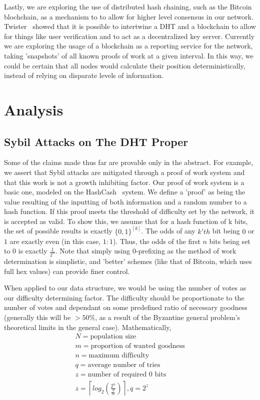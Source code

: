 \documentclass[10pt]{IEEEtran}
\providecommand{\myceil}[1]{\left \lceil #1 \right \rceil }
\begin{document}
\par Lastly, we are exploring the use of distributed hash chaining, such as the Bitcoin blochchain, as a mechanism to to allow for higher level consensus in our network. Twister~\cite{Freitas:2013tb} showed that it is possible to intertwine a DHT and a blockchain to allow for things like user verification and to act as a decentralized key server. Currently we are exploring the usage of a blockchain as a reporting service for the network, taking 'snapshots' of all known proofs of work at a given interval. In this way, we could be certain that all nodes would calculate their position deterministically, instead of relying on disparate levels of information.

\section{Analysis}
\subsection{Sybil Attacks on The DHT Proper}
\par Some of the claims made thus far are provable only in the abstract. For example, we assert that Sybil attacks are mitigated through a proof of work system and that this work is not a growth inhibiting factor. Our proof of work system is a basic one, modeled on the HashCash~\cite{Back:2002vq} system. We define a 'proof' as being the value resulting of the inputting of both information and a random number to a hash function. If this proof meets the threshold of difficulty set by the network, it is accepted as valid. To show this, we assume that for a hash function of k bits, the set of possible results is exactly $\{0,1\}^{[k]}$. The odds of any $k'th$ bit being $0$ or $1$ are exactly even (in this case, $1:1$). Thus, the odds of the first $n$ bits being set to 0 is exactly $\frac{1}{2^n}$. Note that simply using $0$-prefixing as the method of work determination is simplistic, and 'better' schemes (like that of Bitcoin, which uses full hex values) can provide finer control. 

\par When applied to our data structure, we would be using the number of votes as our difficulty determining factor. The difficulty should be proportionate to the number of votes and dependant on some predefined ratio of necessary goodness (generally this will be $ > 50\%$, as a result of the Byzantine general problem's theoretical limits in the general case). Mathematically,
\begin{multline}
N = \textrm{population size} \\
m = \textrm{proportion of wanted goodness} \\
n = \textrm{maximum difficulty} \\
q = \textrm{average number of tries} \\
z = \textrm{number of required 0 bits} \\
z = \myceil{log_2{ (\frac{2^n}{\frac{N}{m}})}}, q = 2^z \\
\end{multline}
\end{document}
